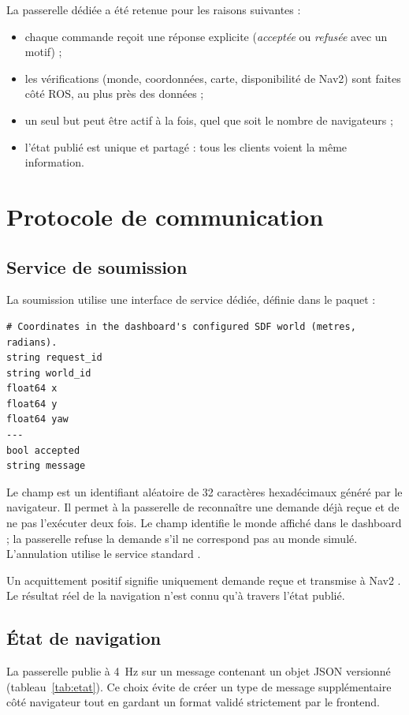 La passerelle dédiée a été retenue pour les raisons suivantes :
\begin{itemize}
  \item chaque commande reçoit une réponse explicite (\emph{acceptée} ou \emph{refusée}
    avec un motif) ;
  \item les vérifications (monde, coordonnées, carte, disponibilité de Nav2) sont faites
    côté ROS, au plus près des données ;
  \item un seul but peut être actif à la fois, quel que soit le nombre de navigateurs ;
  \item l'état publié est unique et partagé : tous les clients voient la même information.
\end{itemize}

\section{Protocole de communication}

\subsection{Service de soumission}
La soumission utilise une interface de service dédiée, définie dans le paquet
 :
\begin{lstlisting}
# Coordinates in the dashboard's configured SDF world (metres, radians).
string request_id
string world_id
float64 x
float64 y
float64 yaw
---
bool accepted
string message
\end{lstlisting}
Le champ  est un identifiant aléatoire de 32 caractères hexadécimaux
généré par le navigateur. Il permet à la passerelle de reconnaître une demande déjà reçue
et de ne pas l'exécuter deux fois. Le champ  identifie le monde affiché dans
le dashboard ; la passerelle refuse la demande s'il ne correspond pas au monde simulé.
L'annulation utilise le service standard .

Un acquittement positif signifie uniquement \og demande reçue et transmise à Nav2 \fg{}. Le
résultat réel de la navigation n'est connu qu'à travers l'état publié.

\subsection{État de navigation}
La passerelle publie à 4~Hz sur  un message
 contenant un objet JSON versionné (tableau~\ref{tab:etat}). Ce
choix évite de créer un type de message supplémentaire côté navigateur tout en gardant un
format validé strictement par le frontend.

